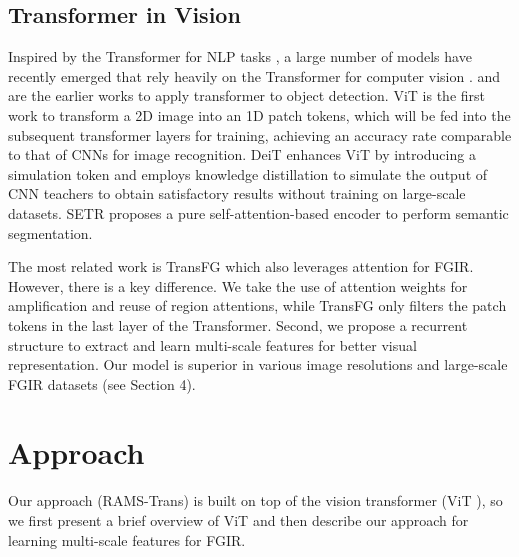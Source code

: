 \documentclass[sigconf]{acmart}
\begin{document}
\subsection{Transformer in Vision} 
Inspired by the Transformer \cite{attention_is} for NLP tasks \cite{Bert, XLNet, XL}, a large number of models have recently emerged that rely heavily on the Transformer for computer vision \cite{ViT, deform}. \cite{end2end} and \cite{deform} are the earlier works to apply transformer to object detection. ViT \cite{ViT} is the first work to transform a 2D image into an 1D patch tokens, which will be fed into the subsequent transformer layers for training, achieving an accuracy rate comparable to that of CNNs for image recognition. DeiT \cite{Deit} enhances ViT \cite{ViT} by introducing a simulation token and employs knowledge distillation to simulate the output of CNN teachers to obtain satisfactory results without training on large-scale datasets. SETR \cite{SETR} proposes a pure self-attention-based encoder to perform semantic segmentation.

The most related work is TransFG \cite{TransFG} which also leverages attention for FGIR. However, there is a key difference. We take the use of attention weights for amplification and reuse of region attentions, while TransFG only filters the patch tokens in the last layer of the Transformer. Second, we propose a recurrent structure to extract and learn multi-scale features for better visual representation. Our model is superior in various image resolutions and large-scale FGIR datasets (see Section 4).

\section{Approach}
Our approach (RAMS-Trans) is built on top of the vision transformer (ViT \cite{ViT}), so we first present a brief overview of ViT and then describe our approach for learning multi-scale features for FGIR.
\end{document}
